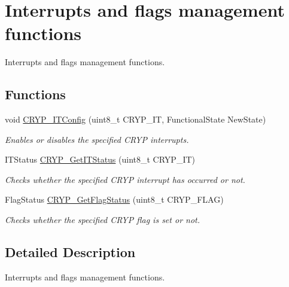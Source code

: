 \hypertarget{group___c_r_y_p___group5}{}\section{Interrupts and flags management functions}
\label{group___c_r_y_p___group5}


Interrupts and flags management functions.  


\subsection*{Functions}
\begin{DoxyCompactItemize}
\item 
void \hyperlink{group___c_r_y_p___group5_gafbf5ee5f2c3ae4404149a994e15b33d8}{C\+R\+Y\+P\+\_\+\+I\+T\+Config} (uint8\+\_\+t C\+R\+Y\+P\+\_\+\+I\+T, Functional\+State New\+State)
\begin{DoxyCompactList}\small\item\em Enables or disables the specified C\+R\+Y\+P interrupts. \end{DoxyCompactList}\item 
I\+T\+Status \hyperlink{group___c_r_y_p___group5_ga00a48b748ed127fa517cacec9dbf18f4}{C\+R\+Y\+P\+\_\+\+Get\+I\+T\+Status} (uint8\+\_\+t C\+R\+Y\+P\+\_\+\+I\+T)
\begin{DoxyCompactList}\small\item\em Checks whether the specified C\+R\+Y\+P interrupt has occurred or not. \end{DoxyCompactList}\item 
Flag\+Status \hyperlink{group___c_r_y_p___group5_ga993d568b626a74b2973d4a6848a681f6}{C\+R\+Y\+P\+\_\+\+Get\+Flag\+Status} (uint8\+\_\+t C\+R\+Y\+P\+\_\+\+F\+L\+A\+G)
\begin{DoxyCompactList}\small\item\em Checks whether the specified C\+R\+Y\+P flag is set or not. \end{DoxyCompactList}\end{DoxyCompactItemize}


\subsection{Detailed Description}
Interrupts and flags management functions. 

